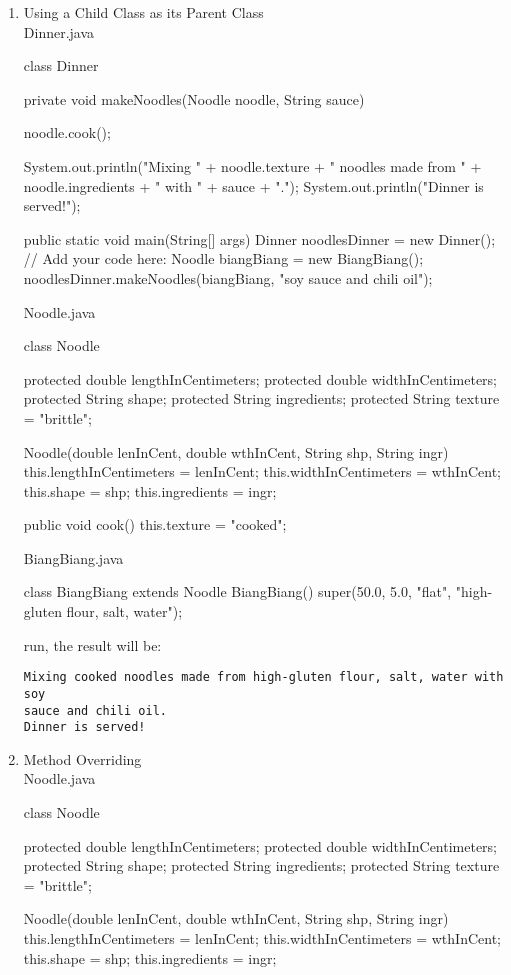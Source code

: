 \documentclass[a4paper,12pt]{article}
\begin{document}
\begin{enumerate}
\item Using a Child Class as its Parent Class\\
Dinner.java
\begin{javacode}
class Dinner {  
  private void makeNoodles(Noodle noodle, String sauce) {    
    noodle.cook();
    
    System.out.println("Mixing " + noodle.texture + " noodles made from " + noodle.ingredients + " with " + sauce + ".");
    System.out.println("Dinner is served!");    
  }
  
  public static void main(String[] args) {    
    Dinner noodlesDinner = new Dinner();
    // Add your code here:
    Noodle biangBiang = new BiangBiang();
    noodlesDinner.makeNoodles(biangBiang, "soy sauce and chili oil");    
  }  
}
\end{javacode}

Noodle.java
\begin{javacode}
class Noodle {  
  protected double lengthInCentimeters;
  protected double widthInCentimeters;
  protected String shape;
  protected String ingredients;
  protected String texture = "brittle";
  
  Noodle(double lenInCent, double wthInCent, String shp, String ingr) {    
    this.lengthInCentimeters = lenInCent;
    this.widthInCentimeters = wthInCent;
    this.shape = shp;
    this.ingredients = ingr;    
  }
  
  public void cook() {    
    this.texture = "cooked";    
  }  
}
\end{javacode}

BiangBiang.java
\begin{javacode}
class BiangBiang extends Noodle {  
  BiangBiang() {    
    super(50.0, 5.0, "flat", "high-gluten flour, salt, water");    
  }  
}
\end{javacode}
run, the result will be:
\begin{verbatim}
Mixing cooked noodles made from high-gluten flour, salt, water with soy 
sauce and chili oil.
Dinner is served!
\end{verbatim}

\item Method Overriding\\
Noodle.java
\begin{javacode}
class Noodle {  
  protected double lengthInCentimeters;
  protected double widthInCentimeters;
  protected String shape;
  protected String ingredients;
  protected String texture = "brittle";
  
  Noodle(double lenInCent, double wthInCent, String shp, String ingr) {    
    this.lengthInCentimeters = lenInCent;
    this.widthInCentimeters = wthInCent;
    this.shape = shp;
    this.ingredients = ingr;    
  }
  
}
\end{javacode}
\end{enumerate}
\end{document}
